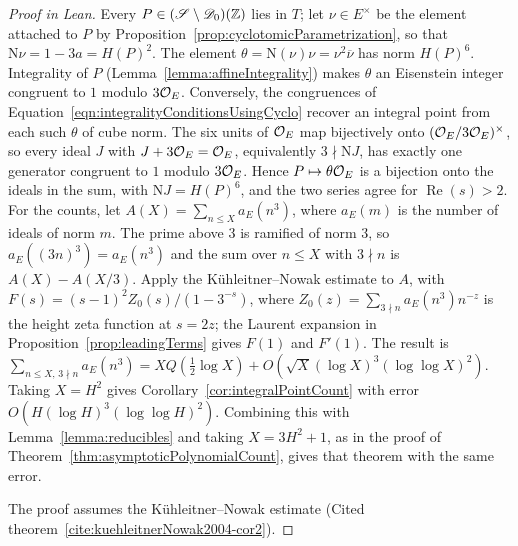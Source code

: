 \begin{proof}[Proof in Lean]

\leanok


Every $P\in(\mathscr{S}\setminus\mathscr{D}_0)(\mathbb{Z})$ lies in $T$; let $\nu\in E^\times$ be the element attached to $P$ by Proposition~\ref{prop:cyclotomicParametrization}, so that $\mathrm N\nu=1-3a=H(P)^2$. The element $\theta=\mathrm N(\nu)\nu=\nu^2\overline\nu$ has norm $H(P)^6$. Integrality of $P$ (Lemma~\ref{lemma:affineIntegrality}) makes $\theta$ an Eisenstein integer congruent to $1$ modulo $3\mathcal{O}_E$. Conversely, the congruences of Equation~\ref{eqn:integralityConditionsUsingCyclo} recover an integral point from each such $\theta$ of cube norm. The six units of $\mathcal{O}_E$ map bijectively onto $(\mathcal{O}_E/3\mathcal{O}_E)^\times$, so every ideal $J$ with $J+3\mathcal{O}_E=\mathcal{O}_E$, equivalently $3\nmid\mathrm NJ$, has exactly one generator congruent to $1$ modulo $3\mathcal{O}_E$. Hence $P\mapsto\theta\mathcal{O}_E$ is a bijection onto the ideals in the sum, with $\mathrm NJ=H(P)^6$, and the two series agree for $\operatorname{Re}(s)>2$. For the counts, let $A(X)=\sum_{n\leq X}a_E(n^3)$, where $a_E(m)$ is the number of ideals of norm $m$. The prime above $3$ is ramified of norm $3$, so $a_E((3n)^3)=a_E(n^3)$ and the sum over $n\leq X$ with $3\nmid n$ is $A(X)-A(X/3)$. Apply the K\"uhleitner--Nowak estimate to $A$, with $F(s)=(s-1)^2Z_0(s)/(1-3^{-s})$, where $Z_0(z)=\sum_{3\nmid n}a_E(n^3)n^{-z}$ is the height zeta function at $s=2z$; the Laurent expansion in Proposition~\ref{prop:leadingTerms} gives $F(1)$ and $F'(1)$. The result is $\sum_{n\leq X,\,3\nmid n}a_E(n^3)=XQ(\tfrac12\log X)+O(\sqrt X(\log X)^3(\log\log X)^2)$. Taking $X=H^2$ gives Corollary~\ref{cor:integralPointCount} with error $O(H(\log H)^3(\log\log H)^2)$. Combining this with Lemma~\ref{lemma:reducibles} and taking $X=3H^2+1$, as in the proof of Theorem~\ref{thm:asymptoticPolynomialCount}, gives that theorem with the same error.

The proof assumes the K\"uhleitner--Nowak estimate (Cited theorem~\ref{cite:kuehleitnerNowak2004-cor2}).

\end{proof}

